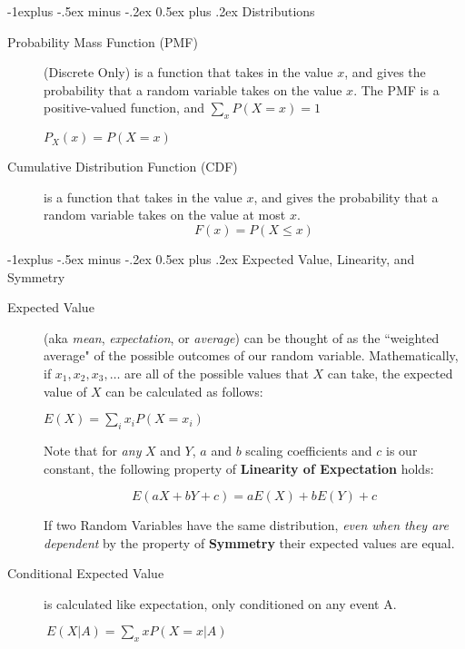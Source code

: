 \documentclass[10pt,landscape]{article}
\makeatletter
\theoremstyle{definition}
\renewcommand{\subsection}{\@startsection{subsection}{2}{0mm}%
                                {-1explus -.5ex minus -.2ex}%
                                {0.5ex plus .2ex}%
                                {\normalfont\normalsize\bfseries}}
\makeatother
\begin{document}
\begin{multicols}{3}
\subsection{Distributions}
\begin{description}

\item[Probability Mass Function (PMF)] (Discrete Only) is a function that takes in the value $x$, and gives the probability that a random variable takes on the value $x$. The PMF is a positive-valued function, and $\sum_xP(X=x) = 1$
\begin{center}
$P_X(x) = P(X=x)$
\end{center}

\item[Cumulative Distribution Function (CDF)] is a function that takes in the value $x$, and gives the probability that a random variable takes on the value at most $x$.
\[F(x) = P(X \leq x)\]


\end{description}


\subsection{Expected Value, Linearity, and Symmetry}
\begin{description}
\item[Expected Value] (aka \emph{mean}, \emph{expectation}, or \emph{average}) can be thought of as the ``weighted average" of the possible outcomes of our random variable. Mathematically, if $x_1, x_2, x_3, \dots$ are all of the possible values that $X$ can take, the expected value of $X$ can be calculated as follows:
\begin{center}
$E(X) = \sum\limits_{i}x_iP(X=x_i)$
\end{center}
Note that for \emph{any} $X$ and $Y$, $a$ and $b$ scaling coefficients and $c$ is our constant, the following property of \textbf{Linearity of Expectation} holds:

\[E(aX + bY + c) = aE(X) + bE(Y) + c \]

If two Random Variables have the same distribution, \emph{even when they are dependent} by the property of \textbf{Symmetry} their expected values are equal.



\item[Conditional Expected Value] is calculated like expectation, only conditioned on any event A. \begin{center}
$\ E(X | A) = \sum\limits_{x}xP(X=x | A)$
\end{center}


\end{description}
\end{multicols}
\end{document}
